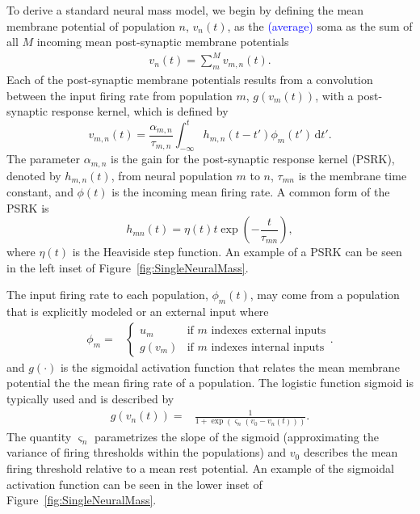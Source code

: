 \documentclass{article}
\newcommand{\brian}[1]{\textcolor{blue}{#1}}
\begin{document}
To derive a standard neural mass model, we begin by defining the mean membrane potential of population $n$, $v_n(t)$, as the \brian{(average)} soma as the sum of all $M$ incoming mean post-synaptic membrane potentials
\begin{align}
	v_n(t) = \sum_m^M v_{m,n}(t).
\end{align}
Each of the post-synaptic membrane potentials results from a convolution between the input firing rate from population $m$, $g(v_m(t))$, with a post-synaptic response kernel, which is defined by
\begin{equation}\label{eq:conv_eq}
    v_{m,n}(t) = \frac{\alpha_{m,n}}{\tau_{m,n}}\int_{-\infty}^t  h_{m,n}(t-t')\phi_m(t') \,\mathrm{d}t'.
\end{equation}
The parameter $\alpha_{m,n}$ is the gain for the post-synaptic response kernel (PSRK), denoted by $h_{m,n}(t)$, from neural population $m$ to $n$, $\tau_{mn}$ is the membrane time constant, and $\phi(t)$ is the incoming mean firing rate. A common form of the PSRK is
\begin{equation}
    h_{mn}(t) = \eta(t)t\exp\left(-\frac{t}{\tau_{mn}}\right),
\end{equation}
where $\eta(t)$ is the Heaviside step function. An example of a PSRK can be seen in the left inset of Figure~\ref{fig:SingleNeuralMass}.  

The input firing rate to each population, $\phi_m(t)$, may come from a population that is explicitly modeled or an external input where
\begin{align}
	\phi_{m} =& \left\{ \begin{array}{lll} u_m  & \text{if } m \text{ indexes external inputs}\\
	g(v_m)  & \text{if } m \text{ indexes internal inputs} \end{array}\right. .
\end{align}
and $g(\cdot)$ is the sigmoidal activation function that relates the mean membrane potential the the mean firing rate of a population. The logistic function sigmoid is typically used and is described by 
\begin{align}
    g\left(v_n(t)\right) =& \frac{1}{1+\exp{\left(\varsigma_n\left(v_{0} - v_n(t)\right)\right)}}.
    \label{eq:sigmoid}
\end{align}
The quantity $\varsigma_n$ parametrizes the slope of the sigmoid (approximating the variance of firing thresholds within the populations) and $v_{0}$ describes the mean firing threshold relative to a mean rest potential. An example of the sigmoidal activation function can be seen in the lower inset of Figure~\ref{fig:SingleNeuralMass}.
\end{document}
